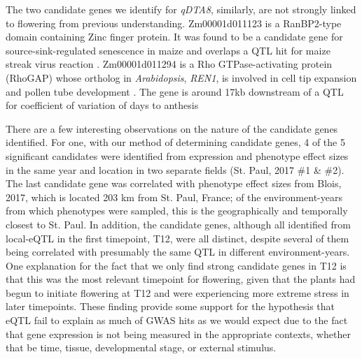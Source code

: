 \documentclass[article,9pt,twocolumn,twoside]{rilabRxiv}
\begin{document}
The two candidate genes we identify for \textit{qDTA8}, similarly, are not strongly linked to flowering from previous understanding.
Zm00001d011123 is a RanBP2-type domain containing Zinc finger protein.
It was found to be a candidate gene for source-sink-regulated senescence in maize \citep{Kumar} and overlaps a QTL hit for maize streak virus reaction \citep{Nair}.
Zm00001d011294 is a Rho GTPase-activating protein (RhoGAP) whose ortholog in \textit{Arabidopsis}, \textit{REN1}, is involved in cell tip expansion and pollen tube development \citep{Hwang}.
The gene is around 17kb downstream of a QTL for coefficient of variation of days to anthesis \citep{Li4}
\par
There are a few interesting observations on the nature of the candidate genes identified.
For one, with our method of determining candidate genes, 4 of the 5 significant candidates were identified from expression and phenotype effect sizes in the same year and location in two separate fields (St. Paul, 2017 \#1 \& \#2).
The last candidate gene was correlated with phenotype effect sizes from Blois, 2017, which is located 203 km from St. Paul, France; of the environment-years from which phenotypes were sampled, this is the geographically and temporally closest to St. Paul.
In addition, the candidate genes, although all identified from local-eQTL in the first timepoint, T12, were all distinct, despite several of them being correlated with presumably the same QTL in different environment-years.
One explanation for the fact that we only find strong candidate genes in T12 is that this was the most relevant timepoint for flowering, given that the plants had begun to initiate flowering at T12 and were experiencing more extreme stress in later timepoints.
These finding provide some support for the hypothesis that eQTL fail to explain as much of GWAS hits as we would expect due to the fact that gene expression is not being measured in the appropriate contexts, whether that be time, tissue, developmental stage, or external stimulus.
\end{document}
